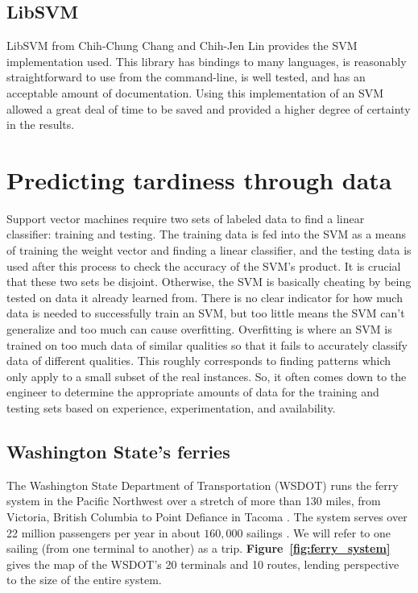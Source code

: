 \documentclass[11pt]{article} %
\begin{document}
\subsection{LibSVM}
\label{sec:libsvm}
LibSVM \cite{chang2011libsvm} from Chih-Chung Chang and Chih-Jen Lin provides the
SVM implementation used.  This library has bindings to many languages, is reasonably
straightforward to use from the command-line, is well tested, and has an acceptable
amount of documentation. Using this implementation of an SVM allowed a great deal
of time to be saved and provided a higher degree of certainty in the results.

\section{Predicting tardiness through data}
\label{sec:problem}
Support vector machines require two sets of labeled data to find a linear classifier:
training and testing. The training data is fed into the SVM as a means of training
the weight vector and finding a linear classifier, and the testing data is used
after this process to check the accuracy of the SVM's product. It is crucial that
these two sets be disjoint. Otherwise, the SVM is basically cheating by being
tested on data it already learned from. There is no clear indicator for how much data
is needed to successfully train an SVM, but too little means the SVM can't 
generalize and too much can cause overfitting. Overfitting is where an SVM is
trained on too much data of similar qualities so that it fails to accurately
classify data of different qualities. This roughly corresponds to finding patterns
which only apply to a small subset of the real instances.  So, it often comes
down to the engineer to determine the appropriate amounts of data for the training
and testing sets based on experience, experimentation, and availability.



\subsection{Washington State's ferries}
\label{sec:wsdot}
The Washington State Department of Transportation (WSDOT) runs the ferry system
in the Pacific Northwest over a stretch of more than 130 miles, from Victoria,
British Columbia to Point Defiance in Tacoma \cite{wsdotFleet}. The system serves
over 22 million passengers per year in about $160,000$ sailings \cite{wsfTraffic}.
We will refer to one sailing (from one terminal to another) as a trip. 
\textbf{Figure~\ref{fig:ferry_system}} gives the map of the WSDOT's 20 terminals
and 10 routes, lending perspective to the size of the entire system.
\end{document}
